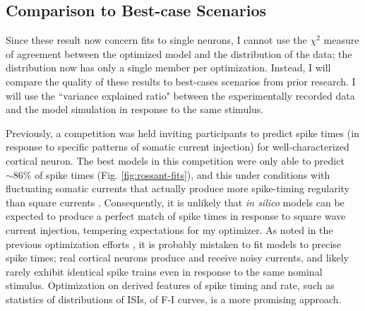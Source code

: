 
\subsection{Comparison to Best-case Scenarios}
Since these result now concern fits to single neurons, I cannot use the $\chi^2$ measure of agreement between the optimized model and the distribution of the data; the distribution now has only a single member per optimization.
Instead, I will compare the quality of these results to best-cases scenarios from prior research.
I will use the ``variance explained ratio" between the experimentally recorded data and the model simulation in response to the same stimulus.

Previously, a competition was held \citep{incf_multi} inviting participants to predict spike times (in response to specific patterns of somatic current injection) for well-characterized cortical neuron.
The best models in this competition were only able to predict $\sim86\%$ of spike times (Fig. \ref{fig:rossant-fits}), and this under conditions with fluctuating somatic currents that actually produce more spike-timing regularity than square currents \citep{mainen1995reliability}.
Consequently, it is unlikely that \emph{in silico} models can be expected to produce a perfect match of spike times in response to square wave current injection, tempering expectations for my optimizer.
As noted in the previous optimization efforts \citep{druckmann2007novel}, it is probably mistaken to fit models to precise spike times; real cortical neurons produce and receive noisy currents, and likely rarely exhibit identical spike trains even in response to the same nominal stimulus.
Optimization on derived features of spike timing and rate, such as statistics of distributions of ISIs, of F-I curves, is a more promising approach.

